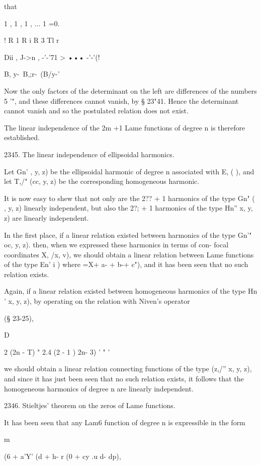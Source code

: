 {{{{{{{that

1 , 1 , 1 , ... 1 =0.

! R 1 R i R 3 Tl r

 Dii , J->n , -'-'71 > ••• -'-'(!



 B, y-\ B,;r-\ (B/y-'

Now the only factors of the determinant on the left are differences of
the numbers 5 '", and these differences cannot vanish, by § 23"41.
Hence the determinant cannot vanish and so the postulated relation
does not exist.

The linear independence of the 2m +1 Lame functions of degree n is
therefore established.

2345. The linear independence of ellipsoidal harmonics.

Let Gn' , y, z) be the ellipsoidal harmonic of degree n associated
with E, ( ), and let T,/" (cc, y, z) be the corresponding homogeneous
harmonic.

It is now easy to shew that not only are the 2?? + 1 harmonics of the
type Gn" ( , y, z) linearly independent, but also the 2?; + 1
harmonics of the type Hn'' x, y, z) are linearly independent.

In the first place, if a linear relation existed between harmonics of
the type Gn'" oc, y, z). then, when we expressed these harmonics in
terms of con- focal coordinates X, /x, v), we should obtain a linear
relation between Lame functions of the type En' i ) where =X+ a- + b-+
c"), and it has been seen that no such relation exists.

Again, if a linear relation existed between homogeneous harmonics of
the type Hn ' x, y, z), by operating on the relation with Niven's
operator

(§ 23-25),

  D\

2 (2n - T) " 2.4 (2 - 1 ) 2n- 3) ' " '

we should obtain a linear relation connecting functions of the type
(z,/'' x, y, z), and since it has just been seen that no such relation
exists, it follows that the homogeneous harmonics of degree n are
linearly independent.

2346. Stieltjes' theorem on the zeros of Lame functions.

It has been seen that any Lam6 function of degree n is expressible in
the form

m

(6 + a'Y' (d + h- r (0 + cy .u d- dp),

}}}}}}}
